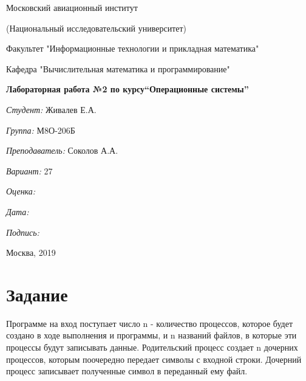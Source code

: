 \documentclass[a4paper, 12pt]{article}
\begin{document}
\thispagestyle{empty}	
\begin{center}
	Московский авиационный институт
	
	(Национальный исследовательский университет)
	
	Факультет "Информационные технологии и прикладная математика"
	
	Кафедра "Вычислительная математика и программирование"
	
\end{center}
\vspace{40ex}
\begin{center}
	\textbf{\large{Лабораторная работа №2 по курсу\linebreak \textquotedblleft Операционные системы\textquotedblright}}
\end{center}
\vspace{35ex}
\begin{flushright}
	\textit{Студент: } Живалев Е.А.
	
	\vspace{2ex}
	\textit{Группа: } М8О-206Б
	
	\vspace{2ex}
	\textit{Преподаватель: } Соколов А.А.
	
	\vspace{2ex}
	\textit{Вариант: } 27
	
	\vspace{2ex}
	\textit{Оценка: } \underline{\quad\quad\quad\quad\quad\quad}
	
	 \vspace{2ex}
	\textit{Дата: } \underline{\quad\quad\quad\quad\quad\quad}
	
	\vspace{2ex}
	\textit{Подпись: } \underline{\quad\quad\quad\quad\quad\quad}
	
\end{flushright}

\vspace{5ex}

\begin{vfill}
	\begin{center}
		Москва, 2019
	\end{center}	
\end{vfill}
\newpage

\section{Задание}

Программе на вход поступает число n - количество процессов, которое будет создано в ходе выполнения и программы, и n названий файлов, в которые эти процессы будут записывать данные. Родительский процесс создает n дочерних процессов, которым поочередно передает символы с входной строки. Дочерний процесс записывает полученные символ в переданный ему файл.
\end{document}

